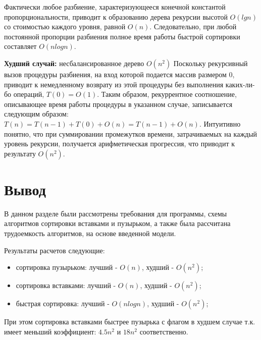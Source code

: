 Фактически любое разбиение, характеризующееся конечной константой пропорциональности, приводит к образованию дерева рекурсии высотой $O(lgn)$ со стоимостью каждого уровня, равной $O(n)$. Следовательно, при любой постоянной пропорции разбиения полное время работы быстрой сортировки составляет $O(nlogn)$.

\textbf{Худший случай:} несбалансированное дерево $O(n^2)$
Поскольку рекурсивный вызов процедуры разбиения, на вход которой подается массив размером 0, приводит к немедленному возврату из этой процедуры без выполнения каких-ли-бо операций, $T(0) = O(1)$. Таким образом, рекуррентное соотношение, описывающее время работы процедуры в указанном случае, записывается следующим образом: 
$T(n) =T(n-1) +T(0) + O(n) =T(n-1) + O(n)$. Интуитивно понятно, что при суммировании промежутков времени, затрачиваемых на каждый уровень рекурсии, получается арифметическая прогрессия, что приводит к результату $O(n^2)$. \cite{Cormen}


\section*{Вывод}
В данном разделе были рассмотрены требования для программы, схемы алгоритмов сортировки вставками и пузырьком, а также была рассчитана трудоемкость алгоритмов, на основе введенной модели.

Результаты расчетов следующие:
\begin{itemize}
	\item сортировка пузырьком: лучший - $O(n)$, худший - $O(n^2)$;
	\item сортировка вставками: лучший - $O(n)$, худший - $O(n^2)$;
	\item быстрая сортировка: лучший - $O(nlogn)$, худший - $O(n^2)$;
\end{itemize}

При этом сортировка вставками быстрее пузырька с флагом в худшем случае т.к. имеет меньший коэффициент: $4.5n^2$ и $18n^2$ соответственно.



